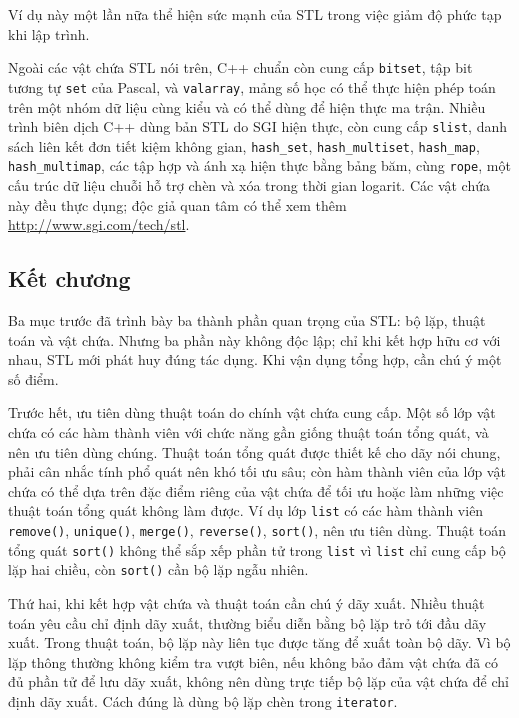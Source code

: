 \documentclass[11pt]{article}
\newcommand{\cpp}{C++}
\newcommand{\pascal}{Pascal}
\begin{document}
Ví dụ này một lần nữa thể hiện sức mạnh của STL trong việc giảm độ phức tạp
khi lập trình.

Ngoài các vật chứa STL nói trên, \cpp{} chuẩn còn cung cấp \verb|bitset|, tập
bit tương tự \verb|set| của \pascal{}, và \verb|valarray|, mảng số học có thể
thực hiện phép toán trên một nhóm dữ liệu cùng kiểu và có thể dùng để hiện
thực ma trận. Nhiều trình biên dịch \cpp{} dùng bản STL do SGI hiện thực, còn
cung cấp \verb|slist|, danh sách liên kết đơn tiết kiệm không gian,
\verb|hash_set|, \verb|hash_multiset|, \verb|hash_map|, \verb|hash_multimap|,
các tập hợp và ánh xạ hiện thực bằng bảng băm, cùng \verb|rope|, một cấu trúc
dữ liệu chuỗi hỗ trợ chèn và xóa trong thời gian logarit. Các vật chứa này
đều thực dụng; độc giả quan tâm có thể xem thêm \url{http://www.sgi.com/tech/stl}.

\subsection{Kết chương}

Ba mục trước đã trình bày ba thành phần quan trọng của STL: bộ lặp, thuật
toán và vật chứa. Nhưng ba phần này không độc lập; chỉ khi kết hợp hữu cơ với
nhau, STL mới phát huy đúng tác dụng. Khi vận dụng tổng hợp, cần chú ý một số
điểm.

Trước hết, ưu tiên dùng thuật toán do chính vật chứa cung cấp. Một số lớp vật
chứa có các hàm thành viên với chức năng gần giống thuật toán tổng quát, và
nên ưu tiên dùng chúng. Thuật toán tổng quát được thiết kế cho dãy nói chung,
phải cân nhắc tính phổ quát nên khó tối ưu sâu; còn hàm thành viên của lớp
vật chứa có thể dựa trên đặc điểm riêng của vật chứa để tối ưu hoặc làm những
việc thuật toán tổng quát không làm được. Ví dụ lớp \verb|list| có các hàm
thành viên \verb|remove()|, \verb|unique()|, \verb|merge()|,
\verb|reverse()|, \verb|sort()|, nên ưu tiên dùng. Thuật toán tổng quát
\verb|sort()| không thể sắp xếp phần tử trong \verb|list| vì \verb|list| chỉ
cung cấp bộ lặp hai chiều, còn \verb|sort()| cần bộ lặp ngẫu nhiên.

Thứ hai, khi kết hợp vật chứa và thuật toán cần chú ý dãy xuất. Nhiều thuật
toán yêu cầu chỉ định dãy xuất, thường biểu diễn bằng bộ lặp trỏ tới đầu dãy
xuất. Trong thuật toán, bộ lặp này liên tục được tăng để xuất toàn bộ dãy. Vì
bộ lặp thông thường không kiểm tra vượt biên, nếu không bảo đảm vật chứa đã có
đủ phần tử để lưu dãy xuất, không nên dùng trực tiếp bộ lặp của vật chứa để
chỉ định dãy xuất. Cách đúng là dùng bộ lặp chèn trong \verb|iterator|.
\end{document}
